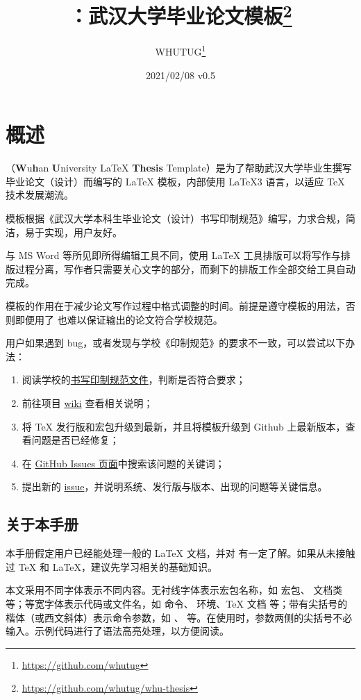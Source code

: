 \documentclass{fdudoc}
\title{\cls{whu-thesis}\bfseries ：武汉大学毕业论文模板\thanks{\url{https://github.com/whutug/whu-thesis}}}
\author{WHUTUG\thanks{\url{https://github.com/whutug}}}
\date{2021/02/08 \quad v0.5}
\begin{document}
\maketitle
\tableofcontents

\section{概述}
（\textbf{W}u\textbf{h}an \textbf{U}niversity \LaTeX{} \textbf{Thesis} Template）是为了帮助武汉大学毕业生撰写毕业论文（设计）而编写的 \LaTeX{} 模板，内部使用 \LaTeX3 语言，以适应 \TeX{} 技术发展潮流。

模板根据《武汉大学本科生毕业论文（设计）书写印制规范》编写，力求合规，简洁，易于实现，用户友好。

与 MS Word 等所见即所得编辑工具不同，使用 \LaTeX{} 工具排版可以将写作与排版过程分离，写作者只需要关心文字的部分，而剩下的排版工作全部交给工具自动完成。

模板的作用在于减少论文写作过程中格式调整的时间。前提是遵守模板的用法，否则即便用了  也难以保证输出的论文符合学校规范。

用户如果遇到 bug，或者发现与学校《印制规范》的要求不一致，可以尝试以下办法：
\begin{enumerate}
    \item 阅读学校的\href{https://github.com/mtobeiyf/whu-thesis/files/4638713/default.pdf}{书写印制规范文件}，判断是否符合要求；
    \item 前往项目 \href{https://github.com/mtobeiyf/whu-thesis/wiki}{wiki} 查看相关说明；
    \item 将 \TeX{} 发行版和宏包升级到最新，并且将模板升级到 Github 上最新版本，查看问题是否已经修复；
    \item 在 \href{https://github.com/mtobeiyf/whu-thesis/issues}{GitHub Issues 页面}中搜索该问题的关键词；
    \item 提出新的 \href{https://github.com/mtobeiyf/whu-thesis/issues}{issue}，并说明系统、发行版与版本、出现的问题等关键信息。
\end{enumerate}

\subsection*{关于本手册}
本手册假定用户已经能处理一般的 \LaTeX{} 文档，并对 \BibTeX{} 有一定了解。如果从未接触过 \TeX{} 和 \LaTeX{}，建议先学习相关的基础知识。

本文采用不同字体表示不同内容。无衬线字体表示宏包名称，如  宏包、 文档类等；等宽字体表示代码或文件名，如  命令、 环境、\TeX{} 文档  等；带有尖括号的楷体（或西文斜体）表示命令参数，如 、 等。在使用时，参数两侧的尖括号不必输入。示例代码进行了语法高亮处理，以方便阅读。
\end{document}
